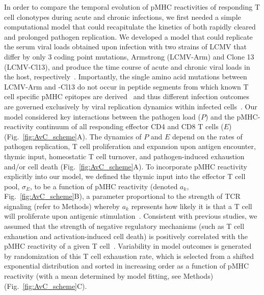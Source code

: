 In order to compare the temporal evolution of pMHC reactivities of responding T cell clonotypes during acute and chronic infections, we first needed a simple computational model that could recapitulate the kinetics of both rapidly cleared and prolonged pathogen replication. We developed a model that could replicate the serum viral loads obtained upon infection with two strains of LCMV that differ by only 3 coding point mutations, Armstrong (LCMV-Arm) and Clone 13 (LCMV-Cl13), and produce the time course of acute and chronic viral loads in the host, respectively~\cite{wherry2003viral,bergthaler2010viral,ahmed1984selection}. Importantly, the single amino acid mutations between LCMV-Arm and -Cl13 do not occur in peptide segments from which known T cell specific pMHC epitopes are derived~\cite{abdel2019viruses,kotturi2007cd8+} and thus different infection outcomes are governed exclusively by viral replication dynamics within infected cells~\cite{abdel2019viruses,bergthaler2010viral}. Our model considered key interactions between the pathogen load ($P$) and the pMHC-reactivity continuum of all responding effector CD4\pos{} and CD8\pos{} T cells ($E$) (Fig.~\ref{fig:AvC_scheme}A). The dynamics of $P$ and $E$ depend on the rates of pathogen replication, T cell proliferation and expansion upon antigen encounter, thymic input, homeostatic T cell turnover, and pathogen-induced exhaustion and/or cell death (Fig.~\ref{fig:AvC_scheme}A). To incorporate pMHC reactivity explicitly into our model, we defined the thymic input into the effector T cell pool, $\sigma_E$, to be a function of pMHC reactivity (denoted $a_k$, Fig.~\ref{fig:AvC_scheme}B), a parameter proportional to the strength of TCR signaling (refer to Methods) whereby $a_k$ represents how likely it is that a T cell will proliferate upon antigenic stimulation~\cite{standifer2009changes}. Consistent with previous studies, we assumed that the strength of negative regulatory mechanisms (such as T cell exhaustion and activation-induced cell death) is positively correlated with the pMHC reactivity of a given T cell~\cite{wherry2003viral,alexander1996role,shakiba2021tcr}. Variability in model outcomes is generated by randomization of this T cell exhaustion rate, which is selected from a shifted exponential distribution and sorted in increasing order as a function of pMHC reactivity (with a mean determined by model fitting, see Methods) (Fig.~\ref{fig:AvC_scheme}C).

